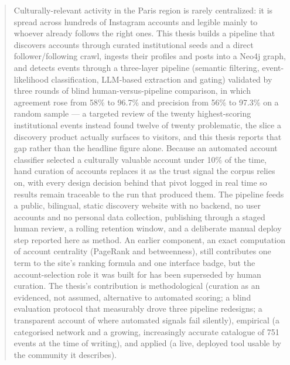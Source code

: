 \documentclass[12pt, a4paper]{report}
\begin{document}
\begin{abstract}
Culturally-relevant activity in the Paris region is rarely centralized: it is spread across hundreds of
Instagram accounts and legible mainly to whoever already follows the
right ones. This thesis builds a pipeline that discovers accounts
through curated institutional seeds and a direct follower/following
crawl, ingests their profiles and posts into a Neo4j graph, and detects
events through a three-layer pipeline (semantic filtering, event-likelihood
classification, LLM-based extraction and gating) validated by three
rounds of blind human-versus-pipeline comparison, in which agreement
rose from 58\% to 96.7\% and precision from 56\% to 97.3\% on a random
sample — a targeted review of the twenty highest-scoring institutional
events instead found twelve of twenty problematic, the slice a
discovery product actually surfaces to visitors, and this thesis reports
that gap rather than the headline figure alone. Because an
automated account classifier selected a culturally valuable account
under 10\% of the time, hand curation of accounts replaces it as the
trust signal the corpus relies on, with every design decision behind
that pivot logged in real time so results remain traceable to the run
that produced them. The pipeline feeds a public, bilingual, static
discovery website with no backend, no user accounts and no personal
data collection, publishing through a staged human review, a rolling
retention window, and a deliberate manual deploy step reported here as
method. An earlier component, an exact computation of account
centrality (PageRank and betweenness), still contributes one term to
the site's ranking formula and one interface badge, but the account-selection
role it was built for has been superseded by human curation. The
thesis's contribution is methodological (curation as an evidenced, not
assumed, alternative to automated scoring; a blind evaluation protocol
that measurably drove three pipeline redesigns; a transparent account
of where automated signals fail silently), empirical (a categorised
network and a growing, increasingly accurate catalogue of 751 events at
the time of writing), and applied (a live, deployed tool usable by the
community it describes).
\end{abstract}

\end{document}
